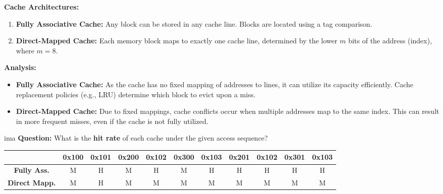 \textbf{Cache Architectures:}
\begin{enumerate}
    \item \textbf{Fully Associative Cache:} Any block can be stored in any cache line. Blocks are located using a tag comparison.
    \item \textbf{Direct-Mapped Cache:} Each memory block maps to exactly one cache line, determined by the lower $m$ bits of the address (index), where $m = 8$.
\end{enumerate}

\textbf{Analysis:}
\begin{itemize}
    \item \textbf{Fully Associative Cache:} As the cache has no fixed mapping of addresses to lines, it can utilize its capacity efficiently. Cache replacement policies (e.g., LRU) determine which block to evict upon a miss.
    \item \textbf{Direct-Mapped Cache:} Due to fixed mappings, cache conflicts occur when multiple addresses map to the same index. This can result in more frequent misses, even if the cache is not fully utilized.
\end{itemize}
ima
\textbf{Question:} What is the \textbf{hit rate} of each cache under the given access sequence?
\begin{center}
    \begin{tabular}{|c|c|c|c|c|c|c|c|c|c|c|}
    \hline
    \textbf{} & \textbf{0x100} & \textbf{0x101} & \textbf{0x200} & \textbf{0x102} & \textbf{0x300} & \textbf{0x103} & \textbf{0x201} & \textbf{0x102} & \textbf{0x301} & \textbf{0x103} \\ \hline
    \textbf{Fully Ass.} & M & H & M & H & M & H & H & H & H & H \\ \hline
    \textbf{Direct Mapp.} & M & H & M & M & M & M & M & M & M & M \\ \hline
    \end{tabular}
\end{center}
    
